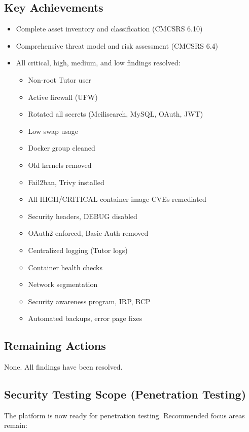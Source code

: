 \subsection{Key Achievements}
\begin{itemize}
    \item Complete asset inventory and classification (CMCSRS 6.10)
    \item Comprehensive threat model and risk assessment (CMCSRS 6.4)
    \item All critical, high, medium, and low findings resolved:
    \begin{itemize}
        \item Non‑root Tutor user
        \item Active firewall (UFW)
        \item Rotated all secrets (Meilisearch, MySQL, OAuth, JWT)
        \item Low swap usage
        \item Docker group cleaned
        \item Old kernels removed
        \item Fail2ban, Trivy installed
        \item All HIGH/CRITICAL container image CVEs remediated
        \item Security headers, DEBUG disabled
        \item OAuth2 enforced, Basic Auth removed
        \item Centralized logging (Tutor logs)
        \item Container health checks
        \item Network segmentation
        \item Security awareness program, IRP, BCP
        \item Automated backups, error page fixes
    \end{itemize}
\end{itemize}

\subsection{Remaining Actions}
None. All findings have been resolved.

\subsection{Security Testing Scope (Penetration Testing)}
The platform is now ready for penetration testing. Recommended focus areas remain:

